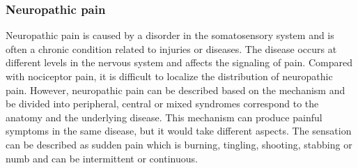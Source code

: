 \subsubsection{Neuropathic pain}
Neuropathic pain is caused by a disorder in the somatosensory system and is often a chronic condition related to injuries or diseases. The disease occurs at different levels in the nervous system and affects the signaling of pain. Compared with nociceptor pain, it is difficult to localize the distribution of neuropathic pain. However, neuropathic pain can be described based on the mechanism and be divided into peripheral, central or mixed syndromes correspond to the anatomy and the underlying disease. This mechanism can produce painful symptoms in the same disease, but it would take different aspects. The sensation can be described as sudden pain which is burning, tingling, shooting, stabbing or numb and can be intermittent or continuous. \cite{Mindruta2013}



